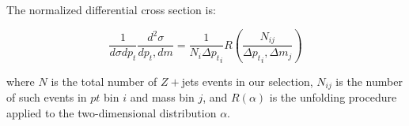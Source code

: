 The normalized differential cross section is:

\begin{equation}
\frac{1}{d\sigma dp_t}\frac{d^2\sigma}{dp_t,dm} = \frac{1}{N_i \Delta {p_t}_i } R(\frac{N_{ij}}{ \Delta {p_t}_i ,\Delta m_j} )
\end{equation}

where $N$ is the total number of $Z+$jets events in our selection,
$N_{ij}$ is the number of such events in $pt$ bin $i$ and mass bin $j$,
and $R(\alpha)$ is the unfolding procedure applied to the two-dimensional
distribution $\alpha$.
